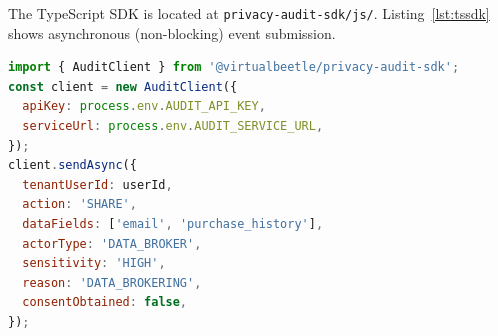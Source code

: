 \documentclass[a4paper,12pt,onecolumn]{report}
\begin{document}
The TypeScript SDK is located at \texttt{privacy-audit-sdk/js/}.
Listing~\ref{lst:tssdk} shows asynchronous (non-blocking) event submission.

\begin{lstlisting}[language=JavaScript, caption={TypeScript SDK non-blocking event submission}, label={lst:tssdk}]
import { AuditClient } from '@virtualbeetle/privacy-audit-sdk';
const client = new AuditClient({
  apiKey: process.env.AUDIT_API_KEY,
  serviceUrl: process.env.AUDIT_SERVICE_URL,
});
client.sendAsync({
  tenantUserId: userId,
  action: 'SHARE',
  dataFields: ['email', 'purchase_history'],
  actorType: 'DATA_BROKER',
  sensitivity: 'HIGH',
  reason: 'DATA_BROKERING',
  consentObtained: false,
});
\end{lstlisting}
\end{document}
